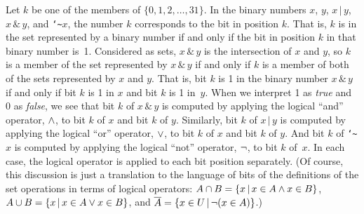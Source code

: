 Let $k$ be one of the members of $\{0,1,2,\dots,31\}$.  In the
binary numbers $x$, $y$, $x\,|\,y$, $x\,\&\,y$, and \texttt{\char`\~}$x$,
the number $k$ corresponds to the bit in position $k$.  That is,
$k$ is in the set represented by a binary number if and only if the
bit in position $k$ in that binary number is~1.
Considered as sets, $x\,\&\,y$ is the intersection of $x$ and $y$,
so $k$ is a member of the set represented by $x\,\&\,y$ if and only if 
$k$ is a member of both of the sets represented by $x$ and $y$.
That is, bit $k$ is 1 in the binary number $x\,\&\,y$ if and only if bit
$k$ is 1 in $x$ and bit $k$ is 1 in~$y$.  When we interpret
1 as \textit{true} and 0 as \textit{false}, we see that
bit $k$ of $x\,\&\,y$ is computed by applying the logical ``and''
operator, $\wedge$,  to bit $k$ of $x$ and bit $k$ of $y$.
Similarly, bit $k$ of $x\,|\,y$ is computed by applying the
logical ``or'' operator, $\vee$, to bit $k$ of $x$ and bit $k$ of $y$.
And bit $k$ of \texttt{\char`\~}$x$ is computed by applying the
logical ``not'' operator, $\lnot$, to bit $k$ of~$x$.  In each
case, the logical operator is applied to each bit position
separately.  (Of course, this discussion is just a translation
to the language of bits of the definitions of the set
operations in terms of logical operators:  
$A\cap B=\{x\,|\, x\in A \wedge x\in B\}$,
$A\cup B=\{x\,|\, x\in A \vee x\in B\}$, and
$\overline{A}=\{x\in U\,|\, \lnot(x\in A)\}$.)

